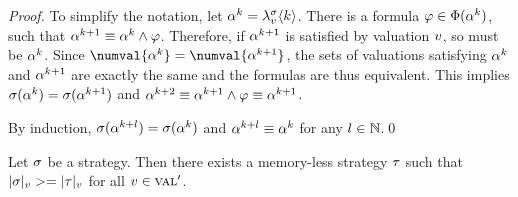 \begin{proof}
To simplify the notation, let $\alpha^k = \lambda^{\sigma}_{v}\langle k\rangle$.
There is a formula $\varphi\in\Phi(\alpha^k)$,
  such that $\alpha^{k+1} \equiv \alpha^{k} \wedge \varphi$.
Therefore, if $\alpha^{k+1}$ is satisfied by valuation $v$, so must be $\alpha^{k}$.
Since $\numval{\know^{k}} = \numval{\know^{k+1}}$, the sets of
  valuations satisfying $\alpha^{k}$ and $\alpha^{k+1}$ are exactly the same
  and the formulas are thus equivalent.
This implies $\sigma(\alpha^{k}) = \sigma(\alpha^{k+1})$ and $\alpha^{k+2} \equiv \alpha^{k+1}\wedge \varphi \equiv \alpha^{k+1}$.

By induction,
  $\sigma(\alpha^{k+l}) = \sigma(\alpha^{k})$ and
  $\alpha^{k+l} \equiv \alpha^{k}$
  for any $l\in\mathbb{N}$.\qed
\end{proof}

\begin{theorem} \label{th:memless}
Let $\sigma$ be a strategy.
Then there exists a memory-less strategy $\tau$ such that
  $|\sigma|_{v} >= |\tau|_{v}$ for all $v\in\textsc{val}'$.
\end{theorem}

